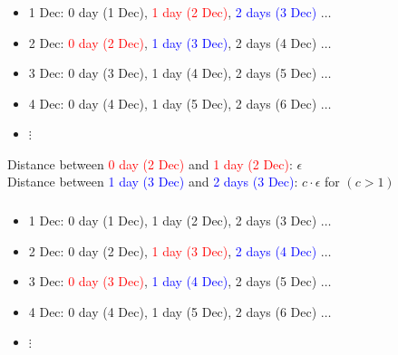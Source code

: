 \documentclass[aspectratio=169]{beamer}
\begin{document}
\begin{frame}
\frametitle{}

\begin{itemize}
\item 1 Dec: 0 day (1 Dec), \textcolor{red}{1 day (2 Dec)}, \textcolor{blue}{2 days (3 Dec)} $\ldots$
\item 2 Dec: \textcolor{red}{0 day (2 Dec)}, \textcolor{blue}{1 day (3 Dec)}, 2 days (4 Dec) $\ldots$
\item 3 Dec: 0 day (3 Dec), 1 day (4 Dec), 2 days (5 Dec) $\ldots$ 
\item 4 Dec: 0 day (4 Dec), 1 day (5 Dec), 2 days (6 Dec) $\ldots$
\item $\vdots$
\end{itemize}

\pause

\vfill
Distance between \textcolor{red}{0 day (2 Dec)} and \textcolor{red}{1 day (2 Dec)}: $\epsilon$\\
\pause
Distance between \textcolor{blue}{1 day (3 Dec)} and  \textcolor{blue}{2 days (3 Dec)}: $c \cdot \epsilon$ for $(c > 1)$

\end{frame}
\begin{frame}
\frametitle{}

\begin{itemize}
\item 1 Dec: 0 day (1 Dec), 1 day (2 Dec), 2 days (3 Dec) $\ldots$
\item 2 Dec: 0 day (2 Dec), \textcolor{red}{1 day (3 Dec)}, \textcolor{blue}{2 days (4 Dec)} $\ldots$
\item 3 Dec: \textcolor{red}{0 day (3 Dec)}, \textcolor{blue}{1 day (4 Dec)}, 2 days (5 Dec) $\ldots$
\item 4 Dec: 0 day (4 Dec), 1 day (5 Dec), 2 days (6 Dec) $\ldots$
\item $\vdots$
\end{itemize}

\pause
\vfill
{}  \\
 

\end{frame}
\end{document}
